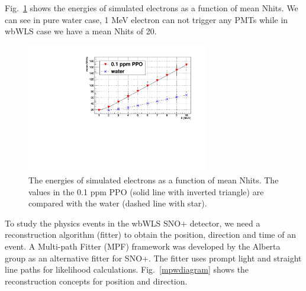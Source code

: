 \documentclass[preprint,12pt]{elsarticle}
\numberwithin{equation}{section}
\begin{document}
%

Fig.~\ref{nhit_wls} shows the energies of simulated electrons as a function of mean Nhits. We can see in pure water case, 1 MeV electron can not trigger any PMTs while in wbWLS case we have a mean Nhits of 20.

\begin{figure}[htbp]
	\centering	
	\includegraphics[width=8cm]{nhits_wls.pdf}
	\caption{ The energies of simulated electrons as a function of mean Nhits. The values in the 0.1 ppm PPO (solid line with inverted triangle) are compared with the water (dashed line with star).}
	\label{nhit_wls}
\end{figure}

To study the physics events in the wbWLS SNO+ detector, we need a reconstruction algorithm (fitter) to obtain the position, direction and time of an event. A Multi-path Fitter (MPF) framework was developed by the Alberta group as an alternative fitter for SNO+. The fitter uses prompt light and straight line paths for likelihood calculations. Fig.~\ref{mpwdiagram} shows the reconstruction concepts for position and direction. 
\end{document}
